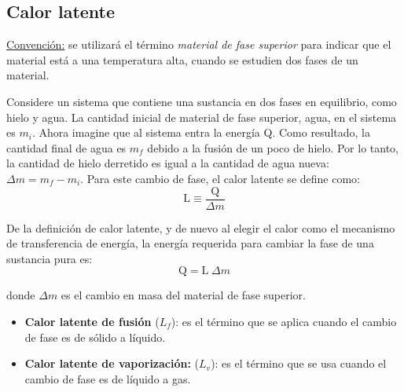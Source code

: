 \subsection{Calor latente}

  \PN \underline{Convención:} se utilizará el término \textit{material de fase superior} para indicar que el material
  está a una temperatura alta, cuando se estudien dos fases de un material.

  \vspace{3mm}
  \PN Considere un sistema que contiene una sustancia en dos fases en equilibrio, como hielo y agua. La cantidad inicial
  de material de fase superior, agua, en el sistema es $m_{i}$. Ahora imagine que al sistema entra la energía Q. Como
  resultado, la cantidad final de agua es $m_{f}$ debido a la fusión de un poco de hielo. Por lo tanto, la cantidad de
  hielo derretido es igual a la cantidad de agua nueva: $\Delta m = m_{f} - m_{i}$. Para este cambio de fase, el calor
  latente se define como:
  \begin{equation*}
    \text{L} \equiv \frac{\text{Q}}{\Delta m}
  \end{equation*}

  \PN De la definición de calor latente, y de nuevo al elegir el calor como el mecanismo de transferencia de energía, la
  energía requerida para cambiar la fase de una sustancia pura es:
  \begin{equation*}
    \text{Q} = \text{L} \; \Delta m
  \end{equation*}

  \PN donde $\Delta m$ es el cambio en masa del material de fase superior.

  \begin{itemize}
    \item \textbf{Calor latente de fusión} ($L_{f}$): es el término que se aplica cuando el cambio de fase es de sólido
    a líquido.
    \item \textbf{Calor latente de vaporización:} ($L_{v}$): es el término que se usa cuando el cambio de fase es de
    líquido a gas.
  \end{itemize}
